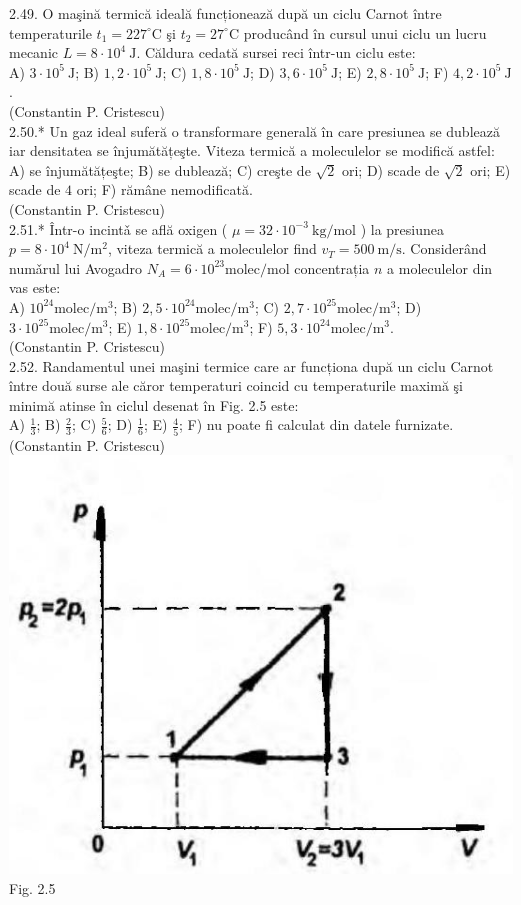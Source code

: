 2.49. O maşină termică ideală funcționează după un ciclu Carnot între temperaturile $t_{1}=227^{\circ} \mathrm{C}$ şi $t_{2}=27^{\circ} \mathrm{C}$ producând în cursul unui ciclu un lucru mecanic $L=8 \cdot 10^{4} \mathrm{~J}$. Căldura cedată sursei reci într-un ciclu este:\\ A) $3 \cdot 10^{5} \mathrm{~J}$; B) $1,2 \cdot 10^{5} \mathrm{~J}$; C) $1,8 \cdot 10^{5} \mathrm{~J}$; D) $3,6 \cdot 10^{5} \mathrm{~J}$; E) $2,8 \cdot 10^{5} \mathrm{~J}$; F) $4,2 \cdot 10^{5} \mathrm{~J}$.\\ (Constantin P. Cristescu)\\

2.50.* Un gaz ideal suferă o transformare generală în care presiunea se dublează iar densitatea se înjumătățeşte. Viteza termică a moleculelor se modifică astfel:\\ A) se înjumătățeşte; B) se dublează; C) creşte de $\sqrt{2}$ ori; D) scade de $\sqrt{2}$ ori; E) scade de $4$ ori; F) rămâne nemodificată.\\ (Constantin P. Cristescu)\\

2.51.* Într-o incintǎ se află oxigen ( $\mu=32 \cdot 10^{-3} \mathrm{~kg} / \mathrm{mol}$ ) la presiunea $p=8 \cdot 10^{4} \mathrm{~N} / \mathrm{m}^{2}$, viteza termică a moleculelor find $v_{T}=500 \mathrm{~m} / \mathrm{s}$. Considerând numǎrul lui Avogadro $N_{A}=6 \cdot 10^{23} \mathrm{molec} / \mathrm{mol}$ concentrația $n$ a moleculelor din vas este:\\ A) $10^{24} \mathrm{molec} / \mathrm{m}^{3}$; B) $2,5 \cdot 10^{24} \mathrm{molec} / \mathrm{m}^{3}$; C) $2,7 \cdot 10^{25} \mathrm{molec} / \mathrm{m}^{3}$; D) $3 \cdot 10^{25} \mathrm{molec} / \mathrm{m}^{3}$; E) $1,8 \cdot 10^{25} \mathrm{molec} / \mathrm{m}^{3}$; F) $5,3 \cdot 10^{24} \mathrm{molec} / \mathrm{m}^{3}$.\\ (Constantin P. Cristescu)\\

2.52. Randamentul unei maşini termice care ar funcționa după un ciclu Carnot între două surse ale căror temperaturi coincid cu temperaturile maximă şi minimă atinse în ciclul desenat în Fig. 2.5 este:\\ A) $\frac{1}{3}$; B) $\frac{2}{3}$; C) $\frac{5}{6}$; D) $\frac{1}{6}$; E) $\frac{4}{5}$; F) nu poate fi calculat din datele furnizate.\\ (Constantin P. Cristescu)\\ \includegraphics[width=0.4\linewidth]{images/2025_07_01_5b3ff9fa0d508c8e9f17g-084} Fig. 2.5\\

